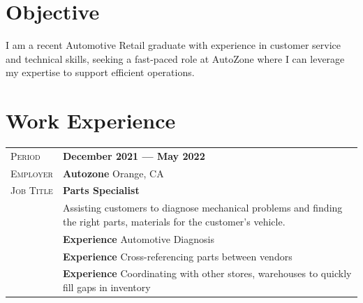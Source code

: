 \documentclass[a4paper, oneside, final]{scrartcl} %
\newcommand{\gray}{\rowcolor[gray]{.90}} %
\begin{document}
\begin{center} %


{\fontsize{36}{36}\selectfont\scshape{}} %

\vspace{1.5cm} %


\section{Objective}

I am a recent Automotive Retail graduate with experience in customer service and technical skills, seeking a fast-paced role at AutoZone where I can leverage my expertise to support efficient operations.


\section{Work Experience}

\begin{tabularx}{0.97\linewidth}{>{\raggedleft\scshape}p{2cm}X}
\gray Period & \textbf{December 2021 --- May 2022}\\
\gray Employer & \textbf{Autozone} \hfill Orange, CA\\
\gray Job Title & \textbf{Parts Specialist}\\
       & Assisting customers to diagnose mechanical problems and finding the right parts, materials for the customer's vehicle.\\
       & \textbf{Experience} Automotive Diagnosis\\
       & \textbf{Experience} Cross-referencing parts between vendors\\
       & \textbf{Experience} Coordinating with other stores, warehouses to quickly fill gaps in inventory
\end{tabularx}


\end{center}
\end{document}
